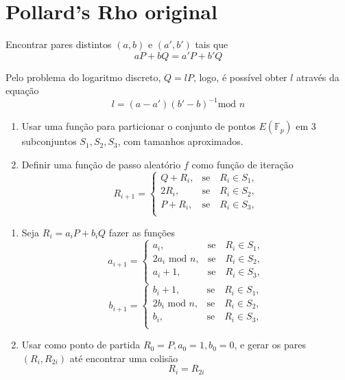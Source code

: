 \documentclass{beamer}
\newcounter{saveenumi}
\newcommand{\seti}{\setcounter{saveenumi}{\value{enumi}}}
\newcommand{\conti}{\setcounter{enumi}{\value{saveenumi}}}
\begin{document}

%
%

\section{Pollard's Rho original}
\begin{frame}
Encontrar pares distintos $(a,b)$ e $(a',b')$ tais que
$$aP + bQ = a'P + b'Q$$

Pelo problema do logaritmo discreto, $Q = lP$, logo, é possível obter $l$ através da equação
$$l = (a - a')(b' - b)^{-1} \mbox{mod }n$$
\end{frame}
\begin{frame}
  \begin{enumerate}
    \item Usar uma função para particionar o conjunto de pontos $E(\mathbb{F}_p)$ em 3 subconjuntos $S_1, S_2, S_3$, com tamanhos aproximados.
    \item Definir uma função de passo aleatório $f$ como função de iteração
    $$
      R_{i+1}=\left\{\begin{array}{rc}
      Q + R_i,&\mbox{se}\quad R_i \in S_1,\\
      2R_i,&\mbox{se}\quad R_i \in S_2,\\
      P + R_i,&\mbox{se}\quad R_i \in S_3,\\
      \end{array}\right.
    $$ 
    \seti
  \end{enumerate}
\end{frame}
\begin{frame}
  \begin{enumerate}
    \conti
    \item Seja $R_i = a_iP + b_iQ$ fazer as funções
      $$
        a_{i+1}=\left\{\begin{array}{rc}
        a_i,&\mbox{se}\quad R_i \in S_1,\\
        2a_i \mbox{ mod }n,&\mbox{se}\quad R_i \in S_2,\\
        a_i + 1,&\mbox{se}\quad R_i \in S_3,\\
        \end{array}\right.
      $$
      $$
        b_{i+1}=\left\{\begin{array}{rc}
        b_i + 1,&\mbox{se}\quad R_i \in S_1,\\
        2b_i \mbox{ mod }n,&\mbox{se}\quad R_i \in S_2,\\
        b_i,&\mbox{se}\quad R_i \in S_3,\\
        \end{array}\right.
      $$
    \item Usar como ponto de partida $R_0 = P, a_0 = 1, b_0 = 0$, e gerar os pares $(R_i, R_{2i})$ até encontrar uma colisão
      $$ R_i = R_{2i} $$
    \conti
  \end{enumerate}
\end{frame}
\end{document}

